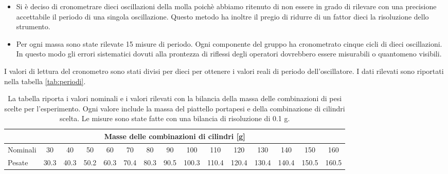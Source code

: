\begin{itemize}
	\item{Si è deciso di cronometrare dieci oscillazioni della molla
        poichè abbiamo ritenuto di non essere in grado di rilevare con una precisione
        accettabile il periodo di una singola oscillazione. Questo metodo ha inoltre
        il pregio di ridurre di un fattor dieci la risoluzione dello strumento.}

	\item{Per ogni massa sono state rilevate 15 misure di periodo.
        Ogni componente del gruppo ha cronometrato cinque cicli di dieci oscillazioni. 
        In questo modo gli errori sistematici dovuti alla prontezza di riflessi degli
        operatori dovrebbero essere misurabili o quantomeno visibili.}
\end{itemize}

I valori di lettura del cronometro sono stati divisi per dieci per ottenere i valori reali di periodo dell'oscillatore.
I dati rilevati sono riportati nella tabella \ref{tab:periodi}.

\begin{table}
    \centering
    \scriptsize
    \begin{tabular}{l | c c c c c c c c c c c c c c}
        \multicolumn{15}{c}{\small \textbf{Masse delle combinazioni di cilindri [g]}} \\[1mm]
        \toprule
        Nominali & 30 & 40 & 50 & 60 & 70 & 80& 90 & 100 & 110 & 120 & 130 & 140 & 150 & 160 \\
        Pesate & 30.3 & 40.3 & 50.2 & 60.3 & 70.4 & 80.3 & 90.5 & 100.3 & 110.4 & 120.4 & 130.4 & 140.4 & 150.5 & 160.5 \\
        \bottomrule
    \end{tabular}
    \caption{La tabella riporta i valori nominali e i valori rilevati con la bilancia della massa delle combinazioni di pesi scelte per
    l'esperimento. Ogni valore include la massa del piattello portapesi e della combinazione di cilindri scelta. Le misure sono state fatte
    con una bilancia di risoluzione di 0.1 g.}
    \label{tab:masse_dinamico}
\end{table}

